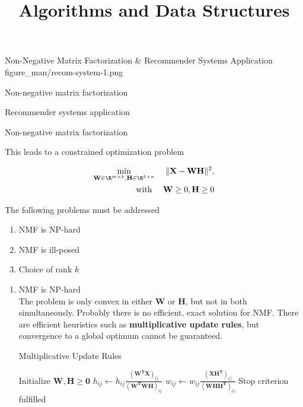 \documentclass[11pt,compress,t,notes=noshow, xcolor=table]{beamer}
\title{Algorithms and Data Structures}
\begin{document}
{Non-Negative Matrix Factorization \& Recommender Systems Application}
{figure_man/recom-system-1.png}
{
  \item Non-negative matrix factorization
  \item Recommender systems application
}

\begin{vbframe}{Non-negative matrix factorization}

This leads to a constrained optimization problem 

\begin{eqnarray*}
 \min_{\mathbf{W}\in \R^{m \times k}, \mathbf{H}\in \R^{k \times n}} & & \|\mathbf{X} - \mathbf{WH}\|^2, \\
\text{with } & & \mathbf{W} \ge 0, \mathbf{H} \ge 0
\end{eqnarray*}

The following problems must be addressed

\begin{enumerate}
\item NMF is NP-hard
\item NMF is ill-posed
\item Choice of rank $k$
\end{enumerate}

\framebreak

\begin{enumerate}
\item NMF is NP-hard \\

The problem is only convex in either $\mathbf{W}$ or $\mathbf{H}$, but not in both simultaneously. Probably there is no efficient, exact solution for NMF. There are efficient heuristics such as \textbf{multiplicative update rules}, but convergence to a global optimum cannot be guaranteed.

\begin{algorithm}[H]
  \caption{Multiplicative Update Rules}
  \begin{algorithmic}[1]
  \State Initialize $\mathbf{W}, \mathbf{H} \ge \mathbf{0}$
  \Repeat
    \State $h_{ij} \leftarrow h_{ij} \frac{(\mathbf{W^TX})_{ij}}{(\mathbf{W^TWH})_{ij}}$
    \State $w_{ij} \leftarrow w_{ij} \frac{(\mathbf{XH^T})_{ij}}{(\mathbf{WHH^T})_{ij}}$
  \Until Stop criterion fulfilled
  \end{algorithmic}
\end{algorithm}

\framebreak


\end{enumerate}
\end{vbframe}
\end{document}
